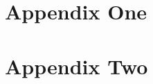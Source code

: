 \documentclass[12pt]{article}
\begin{document}
\newpage
\appendix
\setcounter{table}{0}
\renewcommand{\tablename}{Appendix Table}
\renewcommand{\figurename}{Appendix Figure}
\renewcommand{\thetable}{A\arabic{table}}
\setcounter{figure}{0}
\renewcommand{\thefigure}{A\arabic{figure}}


\newpage 
\section{Appendix One \label{sec:appendix:first}}
\renewcommand{\thetable}{B\arabic{table}}
\setcounter{table}{0}
\renewcommand{\thefigure}{B\arabic{figure}}
\setcounter{figure}{0}



\newpage
\section{Appendix Two
\label{sec:appendix:two}}
\renewcommand{\thetable}{C\arabic{table}}
\setcounter{table}{0}
\renewcommand{\thefigure}{C\arabic{figure}}
\setcounter{figure}{0}
\end{document}
